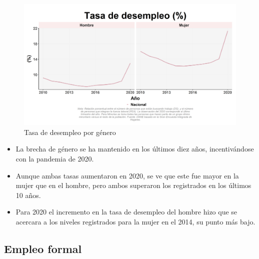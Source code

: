     \begin{figure}[H]
        \caption{Tasa de desempleo por género \label{map_result_2} }
        \begin{center}
        \includegraphics[width=\textwidth,keepaspectratio]{img/var_49_trend.png}
        \end{center}
    \end{figure}
            \begin{itemize}
                \item La brecha de género se ha mantenido en los últimos diez años, incentivándose con la pandemia de 2020.
                \item Aunque ambas tasas aumentaron en 2020, se ve que este fue mayor en la mujer que en el hombre, pero ambos superaron los registrados en los últimos 10 años.
                \item Para 2020 el incremento en la tasa de desempleo del hombre hizo que se acercara a los niveles registrados para la mujer en el 2014, su punto más bajo.
                \end{itemize}

    \subsection{Empleo formal}

